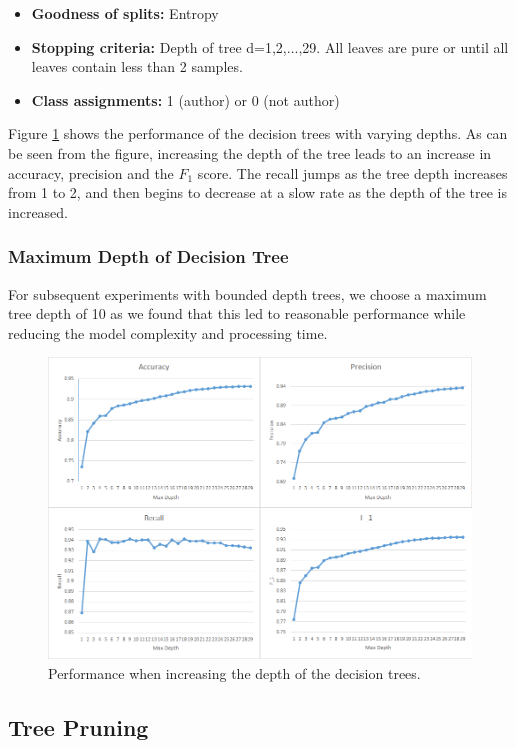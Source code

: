 \documentclass[letterpaper,12pt]{article}
\begin{document}
\begin{itemize}
\item\textbf{Goodness of splits:} Entropy
\item\textbf{Stopping criteria:} Depth of tree d={1,2,...,29}. All leaves are pure or until all leaves contain less than 2 samples.
\item\textbf{Class assignments:} 1 (author) or 0 (not author)
\end{itemize}

Figure \ref{fig:depth} shows the performance of the decision trees with varying depths. As can be seen from the figure, increasing the depth of the tree leads to an increase in accuracy, precision and the $F_1$ score. The recall jumps as the tree depth increases from 1 to 2, and then begins to decrease at a slow rate as the depth of the tree is increased. 

\subsubsection{Maximum Depth of Decision Tree}
\label{subsec:dectreemaxdepth}
For subsequent experiments with bounded depth trees, we choose a maximum tree depth of 10 as we found that this led to reasonable performance while reducing the model complexity and processing time.

\begin{figure}[ht!]
\includegraphics[width=\textwidth]{trees_result.png}
\caption{Performance when increasing the depth of the decision trees.}\label{fig:depth}
\end{figure}

\subsection{Tree Pruning}
\end{document}
